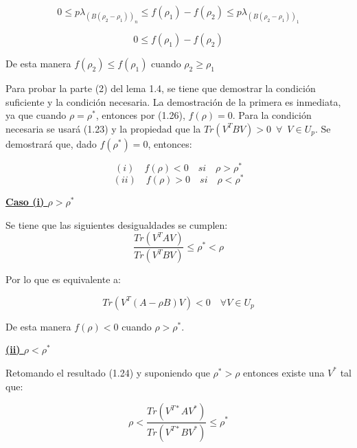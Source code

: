 \begin{equation*}
	0 \leq p \lambda_{(B (\rho_2 - \rho_1))_n} \leq f(\rho_1) - f(\rho_2) \leq  p \lambda_{(B (\rho_2 - \rho_1))_1}
\end{equation*}
	
\begin{equation}\label{eq:2.35}
	0 \leq f(\rho_1) - f(\rho_2)
\end{equation}

De esta manera $f(\rho_2)  \leq  f(\rho_1) $ cuando $\rho_2 \geq \rho_1$

Para probar la parte (2) del lema 1.4, se tiene que demostrar la condición suficiente y la condición necesaria. La demostración de la primera es inmediata, ya que cuando $\rho = \rho^*$, entonces por (1.26), $f(\rho) = 0$. Para la condición necesaria se usará (1.23) y la propiedad que la $Tr(V^T B V) >0 \enspace \forall \enspace V \in U_p$. Se demostrará que, dado $f(\rho^*) = 0$, entonces:


\begin{equation}\label{eq:2.36}
	(i) \quad f(\rho) < 0 \quad si \quad \rho>\rho^*
\end{equation}
\begin{equation}\label{eq:2.37}
	(ii) \quad f(\rho) > 0 \quad si \quad \rho<\rho^*
\end{equation}

\underline{\textbf{Caso (i) $\rho > \rho^* $}}

Se tiene que las siguientes desigualdades se cumplen:
\begin{equation*}
\frac{Tr(V^T A V)}{Tr(V^T B V)} \leq \rho^* < \rho	
\end{equation*}

Por lo que es equivalente a:

\begin{equation*}
	Tr(V^T (A -\rho B)V) < 0 \quad \forall V \in U_p
\end{equation*}


De esta manera $f(\rho) < 0$ cuando $\rho > \rho^*$.
\vspace{5mm}

\underline{\textbf{(ii) $\rho < \rho^* $}}

Retomando el resultado (1.24) y suponiendo que $\rho^* > \rho$ entonces existe una $V^{*}$ tal que:


 \begin{equation*} 
 \rho < \frac{Tr(V^{T*} A V^*)}{Tr(V^{T*} B V^*)} \leq \rho^*
 \end{equation*}


